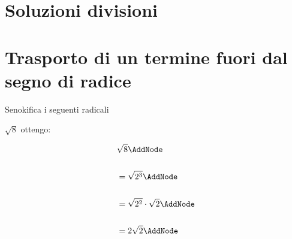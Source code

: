 			\section{Soluzioni divisioni}
			\tcbinputrecords
\section{Trasporto di un termine fuori dal segno di radice}
Senokifica i seguenti radicali
\tcbstartrecording
	\begin{exercise}
		$\sqrt{8}$
		\tcblower
		ottengo:
		\begin{NodesList}
			\begin{align*}
				&\sqrt{8}\AddNode\\
				&\\
				&=\sqrt{2^3}\AddNode\\
				&\\
				&=\sqrt{2^2}\cdot\sqrt{2}\AddNode\\
				&\\
				&=2\sqrt{2}\AddNode
			\end{align*}
						
					\end{NodesList}
				\end{exercise}

